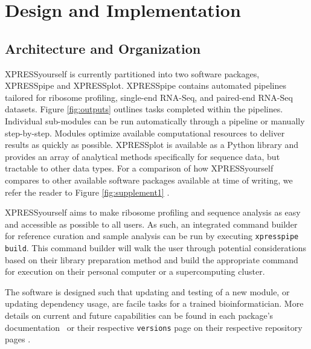 \documentclass[10pt, oneside]{article}
\begin{document}
\section*{Design and Implementation}
\subsection*{Architecture and Organization}
XPRESSyourself is currently partitioned into two software packages, XPRESSpipe and XPRESSplot. XPRESSpipe contains automated pipelines tailored for ribosome profiling, single-end RNA-Seq, and paired-end RNA-Seq datasets. Figure \ref{fig:outputs} outlines tasks completed within the pipelines. Individual sub-modules can be run automatically through a pipeline or manually step-by-step. Modules optimize available computational resources to deliver results as quickly as possible. XPRESSplot is available as a Python library and provides an array of analytical methods specifically for sequence data, but tractable to other data types. For a comparison of how XPRESSyourself compares to other available software packages available at time of writing, we refer the reader to Figure \ref{fig:supplement1} \cite{galaxy, ribogalaxy, pausepred, anota2seq, riboprofiling, riborex, mqc, shoelaces, supertranscripts, systempiper, orfik, comet_1, comet_2, riboseqr, deeptools, picard, rose, rust, xtail, ribodiff, ribotaper, ribomap_1, ribomap_2, plastid, riboviz, ribostreamr, scikit_ribo, spectre}.\par

XPRESSyourself aims to make ribosome profiling and sequence analysis as easy and accessible as possible to all users. As such, an integrated command builder for reference curation and sample analysis can be run by executing \texttt{xpresspipe build}. This command builder will walk the user through potential considerations based on their library preparation method and build the appropriate command for execution on their personal computer or a supercomputing cluster.\par

The software is designed such that updating and testing of a new module, or updating dependency usage, are facile tasks for a trained bioinformatician. More details on current and future capabilities can be found in each package's documentation \cite{xpresspipe_docs, xpressplot_docs} or their respective \texttt{versions} page on their respective repository pages \cite{xpressyourself}.\\
\end{document}
